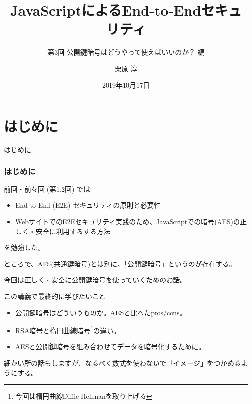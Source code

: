\documentclass[12pt,dvipdfmx]{beamer}
\title[E2E Security with JS 03]{JavaScriptによるEnd-to-Endセキュリティ}
\subtitle{第3回 公開鍵暗号はどうやって使えばいいのか？ 編}
\author[Jun Kurihara]{栗原 淳}
\institute[]{}
\date[Oct. 17, 2019]{2019年10月17日}
\begin{document}
\begin{frame}
\titlepage
\end{frame}

\section{はじめに}
\begin{frame}
 \centering
 {\Large はじめに}
\end{frame}

\begin{frame}
\frametitle{はじめに}
前回・前々回 (第1,2回) では
\begin{itemize}
 \item End-to-End (E2E) セキュリティの原則と必要性
 \item WebサイトでのE2Eセキュリティ実践のため、JavaScriptでの暗号(AES)の正しく・安全に利用するする方法
\end{itemize}
を勉強した。


\vspace{2ex}

ところで、AES(共通鍵暗号)とは別に、「公開鍵暗号」というのが存在する。
\end{frame}

\begin{frame}
今回は\underline{正しく・安全に}公開鍵暗号を使っていくためのお話。

\begin{block}{\small この講義で最終的に学びたいこと}
\begin{itemize}
\item 公開鍵暗号はどういうものか。AESと比べたpros/cons。
\item RSA暗号と楕円曲線暗号\footnote[frame]{今回は楕円曲線Diffie-Hellmanを取り上げる}の違い。
\item AESと公開鍵暗号を組み合わせてデータを暗号化するために。
\end{itemize}
\end{block}

細かい所の話もしますが、なるべく数式を使わないで「イメージ」をつかめるようにする。
\end{frame}
\end{document}
